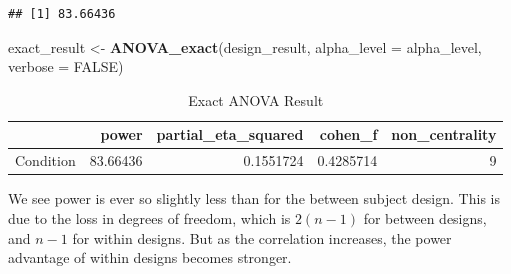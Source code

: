 \documentclass[
]{book}
\newenvironment{Shaded}{\begin{snugshade}}{\end{snugshade}}
\newcommand{\CommentTok}[1]{\textcolor[rgb]{0.56,0.35,0.01}{\textit{#1}}}
\newcommand{\DataTypeTok}[1]{\textcolor[rgb]{0.13,0.29,0.53}{#1}}
\newcommand{\DecValTok}[1]{\textcolor[rgb]{0.00,0.00,0.81}{#1}}
\newcommand{\KeywordTok}[1]{\textcolor[rgb]{0.13,0.29,0.53}{\textbf{#1}}}
\newcommand{\NormalTok}[1]{#1}
\newcommand{\OperatorTok}[1]{\textcolor[rgb]{0.81,0.36,0.00}{\textbf{#1}}}
\newcommand{\OtherTok}[1]{\textcolor[rgb]{0.56,0.35,0.01}{#1}}
\newcommand{\StringTok}[1]{\textcolor[rgb]{0.31,0.60,0.02}{#1}}
\begin{document}
\begin{verbatim}
## [1] 83.66436
\end{verbatim}

\begin{Shaded}
\begin{Highlighting}[]
\NormalTok{exact_result <-}\StringTok{ }\KeywordTok{ANOVA_exact}\NormalTok{(design_result,}
                            \DataTypeTok{alpha_level =}\NormalTok{ alpha_level,}
                            \DataTypeTok{verbose =} \OtherTok{FALSE}\NormalTok{)}
\end{Highlighting}
\end{Shaded}

\begin{table}[!h]

\caption{\label{tab:unnamed-chunk-247}Exact ANOVA Result}
\centering
\begin{tabular}[t]{l|r|r|r|r}
\hline
  & power & partial\_eta\_squared & cohen\_f & non\_centrality\\
\hline
Condition & 83.66436 & 0.1551724 & 0.4285714 & 9\\
\hline
\end{tabular}
\end{table}

We see power is ever so slightly less than for the between subject design. This is due to the loss in degrees of freedom, which is \(2(n-1)\) for between designs, and \(n-1\) for within designs. But as the correlation increases, the power advantage of within designs becomes stronger.

\begin{Shaded}
\end{Shaded}
\end{document}
